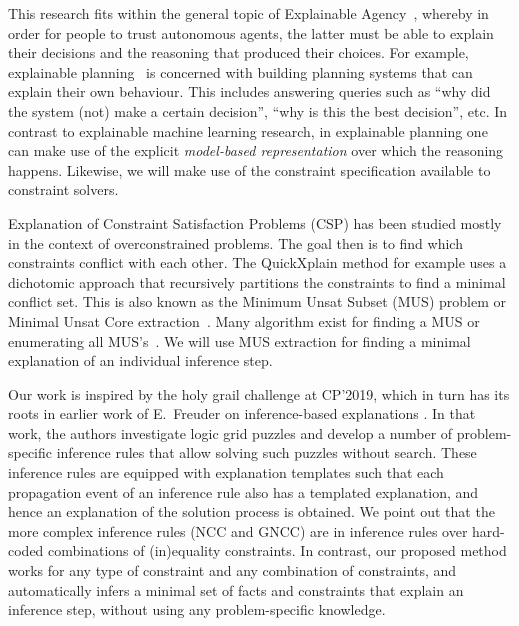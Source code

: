 This research fits within the general topic of Explainable Agency~\cite{langley2017explainable}, whereby in order for people to trust autonomous agents, the latter must be able to explain their decisions and the reasoning that produced their choices. 
For example, explainable planning~\cite{fox2017explainable} is concerned with building planning systems that can explain their own behaviour. This includes answering queries such as ``why did the system (not) make a certain decision'', ``why is this the best decision'', etc. In contrast to explainable machine learning research, in explainable planning one can make use of the explicit \textit{model-based representation} over which the reasoning happens. Likewise, we will make use of the constraint specification available to constraint solvers. %

Explanation of Constraint Satisfaction Problems (CSP) has been studied mostly in the context of overconstrained problems. 
The goal then is to find which constraints conflict with each other. The QuickXplain method \cite{junker2001quickxplain} for example uses a dichotomic approach that recursively partitions the constraints to find a minimal conflict set. This is also known as the Minimum Unsat Subset (MUS) problem or Minimal Unsat Core extraction~\cite{marques2010minimal}. Many algorithm exist for finding a MUS or enumerating all MUS's~\cite{marques2010minimal}. We will use MUS extraction for finding a minimal explanation of an individual inference step.

Our work is inspired by the holy grail challenge at CP'2019, which in turn has its roots in earlier work of E.~Freuder on inference-based explanations \cite{sqalli1996inference}. In that work, the authors investigate logic grid puzzles and develop a number of problem-specific inference rules that allow solving such puzzles without search. These inference rules are equipped with explanation templates such that each propagation event of an inference rule also has a templated explanation, and hence an explanation of the solution process is obtained. We point out that the more complex inference rules (NCC and GNCC) are in inference rules over hard-coded combinations of (in)equality constraints. In contrast, our proposed method works for any type of constraint and any combination of constraints, and automatically infers a minimal set of facts and constraints that explain an inference step, without using any problem-specific knowledge. %

